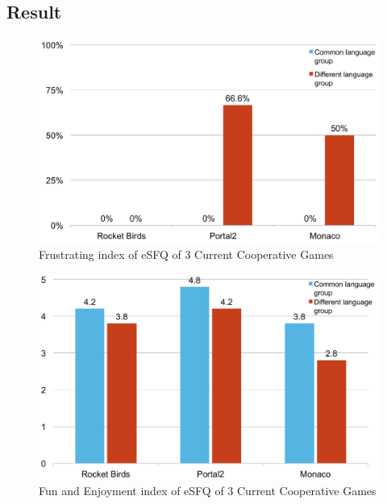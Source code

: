

\subsection{Result}

\begin{figure}[!h]
\centering
\includegraphics[width=0.9\columnwidth]{Figures/PS_Frus.pdf}
\caption{Frustrating index of eSFQ of 3 Current Cooperative Games}
\label{fig:PS_Frus}
\end{figure}

\begin{figure}[!h]
\centering
\includegraphics[width=0.9\columnwidth]{Figures/PS_FunAndEnj.pdf}
\caption{Fun and Enjoyment index of eSFQ of 3 Current Cooperative Games}
\label{fig:PS_FunAndEnj}
\end{figure}


